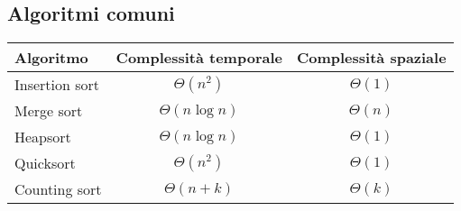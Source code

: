 \subsection{Algoritmi comuni}

\begin{center}
    \begin{tabular}{|l|c|c|}
        \hline
        \textbf{Algoritmo} & \textbf{Complessità temporale} & \textbf{Complessità spaziale} \\
        \hline
        Insertion sort & $\Theta(n^2)$ & $\Theta(1)$ \\
        \hline
        Merge sort & $\Theta(n \log n)$ & $\Theta(n)$ \\
        \hline
        Heapsort & $\Theta(n \log n)$ & $\Theta(1)$ \\
        \hline
        Quicksort & $\Theta(n^2)$ & $\Theta(1)$ \\
        \hline
        Counting sort & $\Theta(n+k)$ & $\Theta(k)$ \\
        \hline
    \end{tabular}
\end{center}